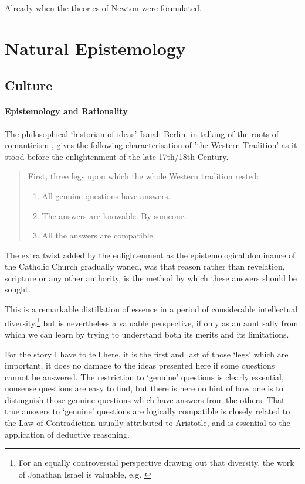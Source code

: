 \documentclass[10pt,titlepage]{book}
\begin{document}
Already when the theories of Newton were formulated.



\part{Natural Epistemology}



\chapter{Culture}
\subsection{Epistemology and Rationality}

The philosophical `historian of ideas' Isaiah Berlin, in talking of the roots of romanticism \cite{berlinRR}, gives the following characterisation of 'the Western Tradition' as it stood before the enlightenment of the late 17th/18th Century.

\begin{quotation}

First, three legs upon which the whole Western tradition rested:
\begin{enumerate}
\item All genuine questions have answers.
\item The answers are knowable.  By someone.
\item All the answers are compatible.
\end{enumerate}
\end{quotation}

The extra twist added by the enlightenment as the epistemological dominance of the Catholic Church gradually waned, was that reason rather than revelation, scripture or any other authority, is the method by which these answers should be sought.

This is a remarkable distillation of essence in a period of considerable intellectual diversity,\footnote{For an equally controversial perspective drawing out that diversity, the work of Jonathan Israel is valuable, e.g. \cite{israel2002radical, israel2013democratic}}%
 but is nevertheless a valuable perspective, if only as an aunt sally from which we can learn by trying to understand both its merits and its limitations.

 For the story I have to tell here, it is the first and last of those `legs' which are important, it does no damage to the ideas presented here if some questions cannot be answered.
 The restriction to `genuine' questions is clearly essential, nonsense questions are easy to find, but there is here no hint of how one is to distinguish those genuine questions which have answers from the others.
That true answers to `genuine' questions are logically compatible is closely related to the Law of Contradiction usually attributed to Aristotle, and is essential to the application of deductive reasoning.
\end{document}
